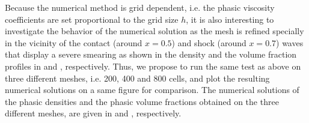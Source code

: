 %
Because the numerical method is grid dependent, i.e. the phasic viscosity coefficients are set proportional to the grid size $h$, it is also interesting to investigate the behavior of the numerical solution as the mesh is refined specially in the
vicinity of the contact (around $x=0.5$) and shock (around $x=0.7$) waves that display a severe smearing as shown in the density and the volume fraction profiles in  and 
, respectively. Thus, we propose to run the same test as above on three different meshes, i.e. 200, 400 and 800 cells, and plot the resulting numerical solutions on a same figure
for comparison. The numerical solutions of the phasic densities and the phasic volume fractions obtained on the three different meshes, are given in  and , respectively.
%
